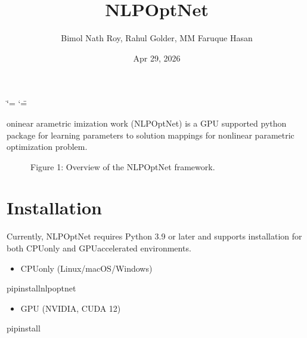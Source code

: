 \documentclass[letterpaper,10pt,english,openany,oneside]{sphinxmanual}
\title{NLPOptNet}
\date{Apr 29, 2026}
\author{Bimol Nath Roy, Rahul Golder, MM Faruque Hasan}
\begin{document}
\ifdefined\shorthandoff
  \ifnum\catcode`\=\string=\active\shorthandoff{=}\fi
  \ifnum\catcode`\"=\active{}\fi
\fi

\pagestyle{empty}
\sphinxmaketitle
\pagestyle{plain}
\sphinxtableofcontents
\pagestyle{normal}
\label{\detokenize{index::doc}}


\sphinxAtStartPar
{}oninear arametric imization work (NLPOpt\sphinxhyphen{}Net) is a GPU supported python package for learning parameters to solution mappings for nonlinear parametric optimization problem.

\begin{figure}[htbp]
\centering
\capstart

\noindent{}
\caption{Figure 1: Overview of the NLPOpt\sphinxhyphen{}Net framework.}\label{\detokenize{index:id1}}\end{figure}


\chapter{Installation}
\label{\detokenize{index:installation}}
\sphinxAtStartPar
Currently, NLPOpt\sphinxhyphen{}Net requires Python 3.9 or later and supports installation for both CPU\sphinxhyphen{}only and GPU\sphinxhyphen{}accelerated environments.
\begin{itemize}
\item {} 
\sphinxAtStartPar
CPU\sphinxhyphen{}only (Linux/macOS/Windows)

\end{itemize}

\begin{sphinxVerbatim}[commandchars=\\\{\}]
pipinstallnlpoptnet
\end{sphinxVerbatim}
\begin{itemize}
\item {} 
\sphinxAtStartPar
GPU (NVIDIA, CUDA 12)

\end{itemize}

\begin{sphinxVerbatim}[commandchars=\\\{\}]
pipinstall
\end{sphinxVerbatim}
\end{document}
